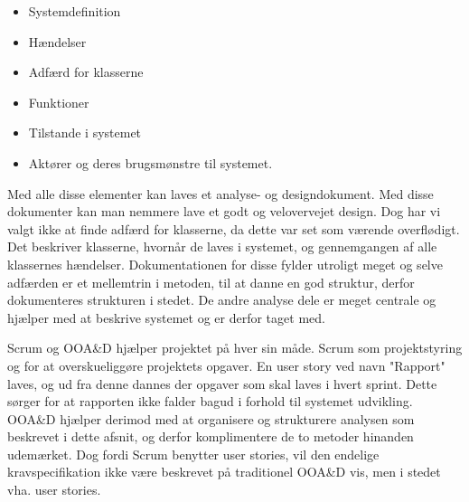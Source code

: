 \begin{itemize}
\item Systemdefinition
\item Hændelser
\item Adfærd for klasserne
\item Funktioner
\item Tilstande i systemet
\item Aktører og deres brugsmønstre til systemet.
\end{itemize}

Med alle disse elementer kan laves et analyse- og designdokument.
Med disse dokumenter kan man nemmere lave et godt og velovervejet design.
Dog har vi valgt ikke at finde adfærd for klasserne, da dette var set som værende overflødigt.
Det beskriver klasserne, hvornår de laves i systemet, og gennemgangen af alle klassernes hændelser. 
Dokumentationen for disse fylder utroligt meget og selve adfærden er et mellemtrin i metoden, til at danne en god struktur, derfor dokumenteres strukturen i stedet.
De andre analyse dele er meget centrale og hjælper med at beskrive systemet og er derfor taget med. 

Scrum og OOA\&D hjælper projektet på hver sin måde.
Scrum som projektstyring og for at overskueliggøre projektets opgaver. 
En user story ved navn "Rapport" laves, og ud fra denne dannes der opgaver som skal laves i hvert sprint. 
Dette sørger for at rapporten ikke falder bagud i forhold til systemet udvikling.
OOA\&D hjælper derimod med at organisere og strukturere analysen som beskrevet i dette afsnit, og derfor komplimentere de to metoder hinanden udemærket.
Dog fordi Scrum benytter user stories, vil den endelige kravspecifikation ikke være beskrevet på traditionel OOA\&D vis, men i stedet vha. user stories.









